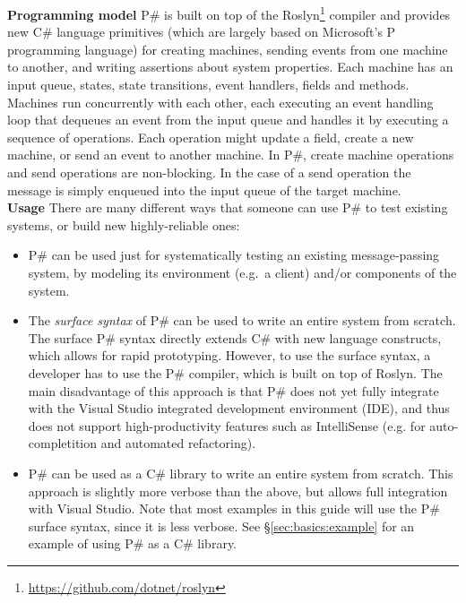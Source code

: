 \documentclass{llncs}
\newcommand{\ps}{P\#\xspace}
\newcommand{\cs}{C\#\xspace}
\newcommand{\newparagraph}[1]{\smallskip\noindent\textbf{#1 }}
\begin{document}
\newparagraph{Programming model} \ps is built on top of the Roslyn\footnote{\textcolor{blue}{\url{https://github.com/dotnet/roslyn}}} compiler and provides new \cs language primitives (which are largely based on Microsoft's P~\cite{desai2013p} programming language) for creating machines, sending events from one machine to another, and writing assertions about system properties. Each machine has an input queue, states, state transitions, event handlers, fields and methods. Machines run concurrently with each other, each executing an event handling loop that dequeues an event from the input queue and handles it by executing a sequence of operations. Each operation might update a field, create a new machine, or send an event to another machine. In \ps, create machine operations and send operations are non-blocking. In the case of a send operation the message is simply enqueued into the input queue of the target machine.\\

\newparagraph{Usage} There are many different ways that someone can use \ps to test existing systems, or build new highly-reliable ones:

\begin{itemize}
\item \ps can be used just for systematically testing an existing message-passing system, by modeling its environment (e.g.\ a client) and/or components of the system.

\item The \emph{surface syntax} of \ps can be used to write an entire system from scratch. The surface \ps syntax directly extends \cs with new language constructs, which allows for rapid prototyping. However, to use the surface syntax, a developer has to use the \ps compiler, which is built on top of Roslyn. The main disadvantage of this approach is that \ps does not yet fully integrate with the Visual Studio integrated development environment (IDE), and thus does not support high-productivity features such as IntelliSense (e.g. for auto-completition and automated refactoring).

\item \ps can be used as a \cs library to write an entire system from scratch. This approach is slightly more verbose than the above, but allows full integration with Visual Studio. Note that most examples in this guide will use the \ps surface syntax, since it is less verbose. See \S\ref{sec:basics:example} for an example of using \ps as a \cs library.
\end{itemize}
\end{document}
